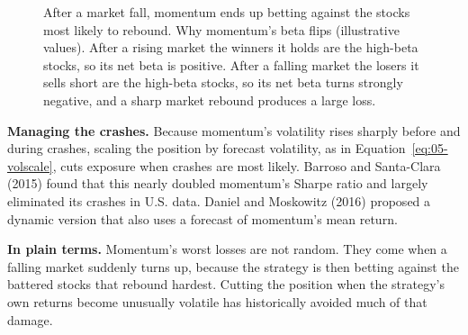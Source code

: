 \begin{figure}[htbp]
\centering
{}
\caption{After a market fall, momentum ends up betting against the stocks most likely to rebound. Why momentum's beta flips (illustrative values). After a rising market the winners it holds are the high-beta stocks, so its net beta is positive. After a falling market the losers it sells short are the high-beta stocks, so its net beta turns strongly negative, and a sharp market rebound produces a large loss.}
\label{fig:05-beta}
\end{figure}

\textbf{Managing the crashes.} Because momentum's volatility rises sharply before and during crashes, scaling the position by forecast volatility, as in Equation~\eqref{eq:05-volscale}, cuts exposure when crashes are most likely. Barroso and Santa-Clara (2015) found that this nearly doubled momentum's Sharpe ratio and largely eliminated its crashes in U.S. data. Daniel and Moskowitz (2016) proposed a dynamic version that also uses a forecast of momentum's mean return.

\noindent\textbf{In plain terms.} Momentum's worst losses are not random. They come when a falling market suddenly turns up, because the strategy is then betting against the battered stocks that rebound hardest. Cutting the position when the strategy's own returns become unusually volatile has historically avoided much of that damage.


